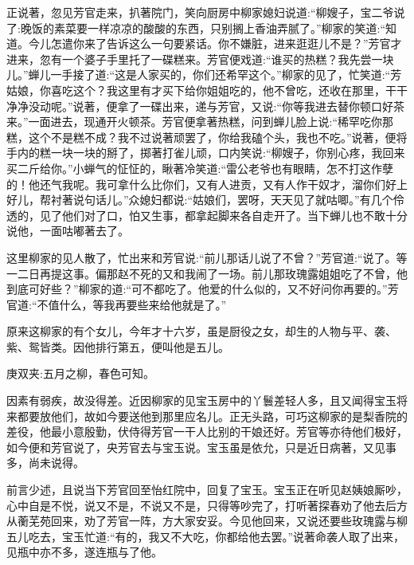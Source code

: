 \begin{parag}
    正说著，忽见芳官走来，扒著院门，笑向厨房中柳家媳妇说道:“柳嫂子，宝二爷说了:晚饭的素菜要一样凉凉的酸酸的东西，只别搁上香油弄腻了。”柳家的笑道:“知道。今儿怎遣你来了告诉这么一句要紧话。你不嫌脏，进来逛逛儿不是？”芳官才进来，忽有一个婆子手里托了一碟糕来。芳官便戏道:“谁买的热糕？我先尝一块儿。”蝉儿一手接了道:“这是人家买的，你们还希罕这个。”柳家的见了，忙笑道:“芳姑娘，你喜吃这个？我这里有才买下给你姐姐吃的，他不曾吃，还收在那里，干干净净没动呢。”说著，便拿了一碟出来，递与芳官，又说:“你等我进去替你顿口好茶来。”一面进去，现通开火顿茶。芳官便拿著热糕，问到蝉儿脸上说:“稀罕吃你那糕，这个不是糕不成？我不过说著顽罢了，你给我磕个头，我也不吃。”说著，便将手内的糕一块一块的掰了，掷著打雀儿顽，口内笑说:“柳嫂子，你别心疼，我回来买二斤给你。”小蝉气的怔怔的，瞅著冷笑道:“雷公老爷也有眼睛，怎不打这作孽的！他还气我呢。我可拿什么比你们，又有人进贡，又有人作干奴才，溜你们好上好儿，帮衬著说句话儿。”众媳妇都说:“姑娘们，罢呀，天天见了就咕唧。”有几个伶透的，见了他们对了口，怕又生事，都拿起脚来各自走开了。当下蝉儿也不敢十分说他，一面咕嘟著去了。
\end{parag}


\begin{parag}
    这里柳家的见人散了，忙出来和芳官说:“前儿那话儿说了不曾？”芳官道:“说了。等一二日再提这事。偏那赵不死的又和我闹了一场。前儿那玫瑰露姐姐吃了不曾，他到底可好些？”柳家的道:“可不都吃了。他爱的什么似的，又不好问你再要的。”芳官道:“不值什么，等我再要些来给他就是了。”
\end{parag}


\begin{parag}
    原来这柳家的有个女儿，今年才十六岁，虽是厨役之女，却生的人物与平、袭、紫、鸳皆类。因他排行第五，便叫他是五儿。\begin{note}庚双夹:五月之柳，春色可知。\end{note}因素有弱疾，故没得差。近因柳家的见宝玉房中的丫鬟差轻人多，且又闻得宝玉将来都要放他们，故如今要送他到那里应名儿。正无头路，可巧这柳家的是梨香院的差役，他最小意殷勤，伏侍得芳官一干人比别的干娘还好。芳官等亦待他们极好，如今便和芳官说了，央芳官去与宝玉说。宝玉虽是依允，只是近日病著，又见事多，尚未说得。
\end{parag}


\begin{parag}
    前言少述，且说当下芳官回至怡红院中，回复了宝玉。宝玉正在听见赵姨娘厮吵，心中自是不悦，说又不是，不说又不是，只得等吵完了，打听著探春劝了他去后方从蘅芜苑回来，劝了芳官一阵，方大家安妥。今见他回来，又说还要些玫瑰露与柳五儿吃去，宝玉忙道:“有的，我又不大吃，你都给他去罢。”说著命袭人取了出来，见瓶中亦不多，遂连瓶与了他。
\end{parag}


